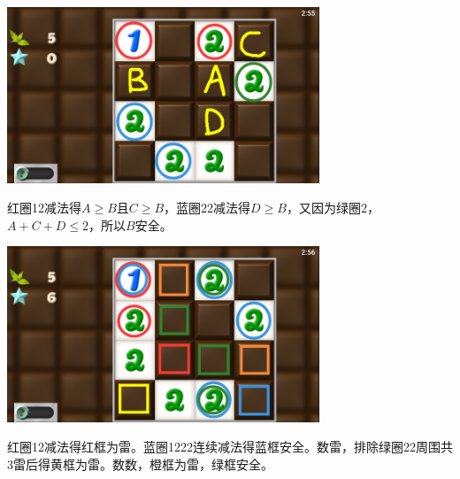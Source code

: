 \subsection{} %
\begin{center}
    \includegraphics[width=0.7\textwidth]{puzzle/152-1.png}
\end{center}
红圈12减法得$A\ge B$且$C\ge B$，蓝圈22减法得$D\ge B$，又因为绿圈2，$A+C+D\le 2$，所以$B$安全。
\begin{center}
    \includegraphics[width=0.7\textwidth]{puzzle/152-2.png}
\end{center}
红圈12减法得红框为雷。蓝圈1222连续减法得蓝框安全。数雷，排除绿圈22周围共3雷后得黄框为雷。数数，橙框为雷，绿框安全。

